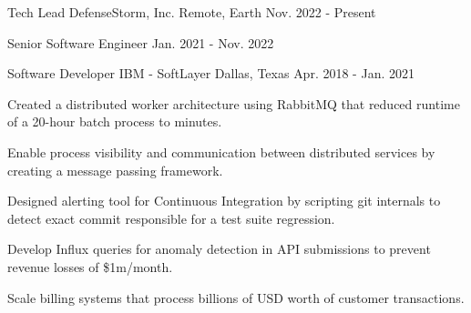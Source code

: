 
\begin{cventries}

    \cventry
    {Tech Lead}
    {DefenseStorm, Inc.}
    {Remote, Earth}
    {Nov. 2022 - Present}
    {
        \begin{cvitems}
        \end{cvitems}
    }

    \cventry
    {Senior Software Engineer}
    {} %
    {} %
    {Jan. 2021 - Nov. 2022}
    {
        \begin{cvitems}
        \end{cvitems}
    }

	\cventry
	{Software Developer}
	{IBM - SoftLayer}
	{Dallas, Texas}
	{Apr. 2018 - Jan. 2021}
	{
		\begin{cvitems}
			\item {Created a distributed worker architecture using RabbitMQ that reduced runtime of a 20-hour batch process to minutes.}
			\item {Enable process visibility and communication between distributed services by creating a message passing framework.}
			\item {Designed alerting tool for Continuous Integration by scripting git internals to detect exact commit responsible for a test suite regression.}
			\item {Develop Influx queries for anomaly detection in API submissions to prevent revenue losses of \$1m/month.}
			\item {Scale billing systems that process billions of USD worth of customer transactions.}
		\end{cvitems}
	}
	
%	


\end{cventries}
